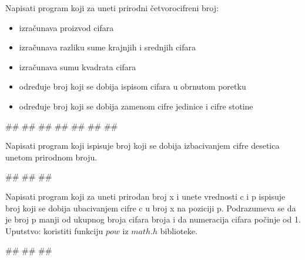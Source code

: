 \begin{Exercise}[label=p1_07] 
Napisati program koji za uneti prirodni četvorocifreni broj:
\begin{itemize}
\item izračunava proizvod cifara
\item izračunava razliku sume krajnjih i srednjih cifara 
\item izračunava sumu kvadrata cifara
\item određuje broj koji se dobija ispisom cifara u obrnutom poretku
\item određuje broj koji se dobija zamenom cifre jedinice i cifre stotine
\end{itemize}

\begin{maxitest}
\begin{upotreba}{1}
#\naslovInt#
##
##
##
##
##
##
\end{upotreba}
\end{maxitest}
\end{Exercise}
\begin{Answer}[ref=p1_07]
\end{Answer}


\begin{Exercise}[label=p1_08] 
Napisati program koji ispisuje broj koji se dobija izbacivanjem cifre desetica unetom prirodnom broju. \\
\begin{miditest}
\begin{upotreba}{1}
#\naslovInt#
##
##
\end{upotreba}
\end{miditest}
\end{Exercise}
\begin{Answer}[ref=p1_08]
\end{Answer}


\begin{Exercise}[label=p1_09] 
Napisati program koji za uneti prirodan broj x i unete vrednosti c i p ispisuje broj koji se dobija ubacivanjem cifre c  u broj x 
na poziciji p. Podrazumeva se da je broj p manji od ukupnog broja cifara broja i da numeracija cifara počinje od 1. Uputstvo: koristiti funkciju $pow$ iz $math.h$ biblioteke.\\
\begin{miditest}
\begin{upotreba}{1}
#\naslovInt#
##
##
\end{upotreba}
\end{miditest}
\end{Exercise}
\begin{Answer}[ref=p1_09]
\end{Answer}


